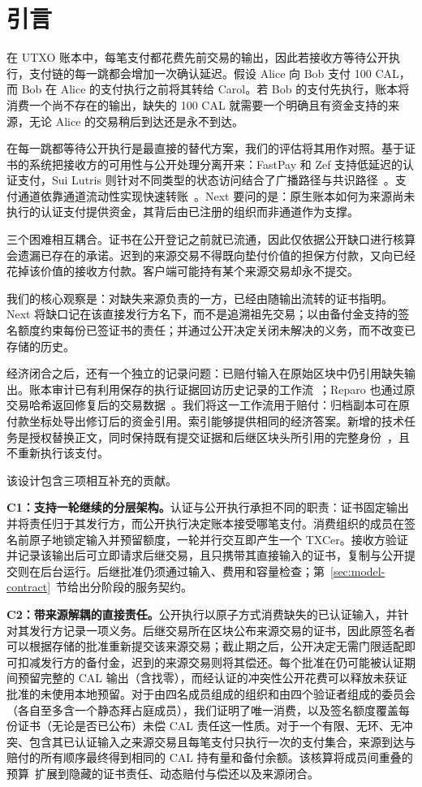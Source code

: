 \section{引言}
\label{sec:introduction}

在 UTXO 账本中，每笔支付都花费先前交易的输出，因此若接收方等待公开执行，支付链的每一跳都会增加一次确认延迟。假设 Alice 向 Bob 支付 100 CAL，而 Bob 在 Alice 的支付执行之前将其转给 Carol。若 Bob 的支付先执行，账本将消费一个尚不存在的输出，缺失的 100 CAL 就需要一个明确且有资金支持的来源，无论 Alice 的交易稍后到达还是永不到达。

在每一跳都等待公开执行是最直接的替代方案，我们的评估将其用作对照。基于证书的系统把接收方的可用性与公开处理分离开来：FastPay 和 Zef 支持低延迟的认证支付，Sui Lutris 则针对不同类型的状态访问结合了广播路径与共识路径~\cite{fastpay,zef,lutris}。支付通道依靠通道流动性实现快速转账~\cite{blitz,donner}。Next 要问的是：原生账本如何为来源尚未执行的认证支付提供资金，其背后由已注册的组织而非通道作为支撑。

三个困难相互耦合。证书在公开登记之前就已流通，因此仅依据公开缺口进行核算会遗漏已存在的承诺。迟到的来源交易不得既向垫付价值的担保方付款，又向已经花掉该价值的接收方付款。客户端可能持有某个来源交易却永不提交。

我们的核心观察是：对缺失来源负责的一方，已经由随输出流转的证书指明。Next 将缺口记在该直接发行方名下，而不是追溯祖先交易；以由备付金支持的签名额度约束每份已签证书的责任；并通过公开决定关闭未解决的义务，而不改变已存储的历史。

经济闭合之后，还有一个独立的记录问题：已赔付输入在原始区块中仍引用缺失输出。账本审计已有利用保存的执行证据回访历史记录的工作流~\cite{ia-ccf}；Reparo 也通过原交易哈希返回修复后的交易数据~\cite{reparo}。我们将这一工作流用于赔付：归档副本可在原付款坐标处导出修订后的资金引用。索引能够提供相同的经济答案。新增的技术任务是授权替换正文，同时保持既有提交证据和后继区块头所引用的完整身份~\cite{comet-blockid}，且不重新执行该支付。

该设计包含三项相互补充的贡献。

\noindent\textbf{C1：支持一轮继续的分层架构。}认证与公开执行承担不同的职责：证书固定输出并将责任归于其发行方，而公开执行决定账本接受哪笔支付。消费组织的成员在签名前原子地锁定输入并预留额度，一轮并行交互即产生一个 TXCer。接收方验证并记录该输出后可立即请求后继交易，且只携带其直接输入的证书，复制与公开提交则在后台运行。后继批准仍须通过输入、费用和容量检查；第~\ref{sec:model-contract}~节给出分阶段的服务契约。

\noindent\textbf{C2：带来源解耦的直接责任。}公开执行以原子方式消费缺失的已认证输入，并针对其发行方记录一项义务。后继交易所在区块公布来源交易的证书，因此原签名者可以根据存储的批准重新提交该来源交易；截止期之后，公开决定无需门限适配即可扣减发行方的备付金，迟到的来源交易则将其偿还。每个批准在仍可能被认证期间预留完整的 CAL 输出（含找零），而经认证的冲突性公开花费可以释放未获证批准的未使用本地预留。对于由四名成员组成的组织和由四个验证者组成的委员会（各自至多含一个静态拜占庭成员），我们证明了唯一消费，以及签名额度覆盖每份证书（无论是否已公布）未偿 CAL 责任这一性质。对于一个有限、无环、无冲突、包含其已认证输入之来源交易且每笔支付只执行一次的支付集合，来源到达与赔付的所有顺序最终得到相同的 CAL 持有量和备付余额。该核算将成员间重叠的预算~\cite{stingray}扩展到隐藏的证书责任、动态赔付与偿还以及来源闭合。

